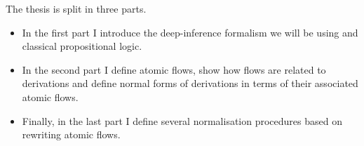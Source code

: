 The thesis is split in three parts.
\begin{itemize}
\item In the first part I introduce the deep-inference formalism we will be using and classical propositional logic.
\item In the second part I define atomic flows, show how flows are related to derivations and define normal forms of derivations in terms of their associated atomic flows.
\item Finally, in the last part I define several normalisation procedures based on rewriting atomic flows.
\end{itemize}